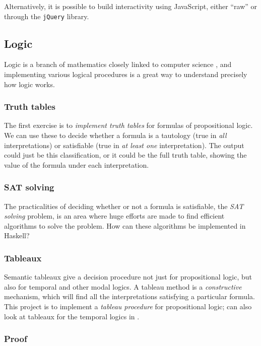 Alternatively, it is possible to build interactivity using JavaScript, either ``raw'' or  through the \texttt{jQuery} library.

\subsection*{Logic}

Logic is a branch of mathematics closely linked to computer science \cite{HuthAndRyan}, and implementing various logical procedures is a great way to understand precisely how logic works. 

\subsubsection*{Truth tables}

The first exercise is to \emph{implement truth tables} for formulas of propositional logic. We can use these to decide whether a formula is a tautology (true in \emph{all} interpretations) or satisfiable (true in \emph{at least one} interpretation). The output could just be this classification, or it could be the full truth table, showing the value of the formula under each interpretation.

\subsubsection*{SAT solving}

The practicalities of deciding whether or not a formula is satisfiable, the \emph{SAT solving} problem, is an area where huge efforts are made to find efficient algorithms to solve the problem. How can these algorithms be implemented in Haskell?

\subsubsection*{Tableaux}

Semantic tableaux give a decision procedure not just for propositional logic, but also for temporal and other modal logics. A tableau method is a \emph{constructive} mechanism, which will find all the interpretations satisfying a particular formula. This project is to implement a \emph{tableau procedure} for propositional logic; can also look at tableaux for the temporal logics in \cite{HuthAndRyan}.

\subsubsection*{Proof}

